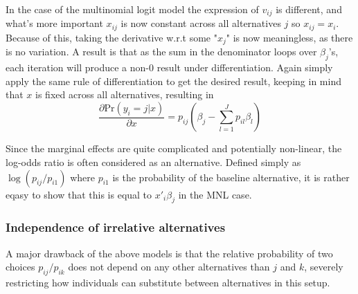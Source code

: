 In the case of the multinomial logit model the expression of $v_{ij}$ is different, and what's more important $x_{ij}$ is now constant across all alternatives $j$ so $x_{ij}=x_i$. Because of this, taking the derivative w.r.t some "$x_j$" is now meaningless, as there is no variation. A result is that as the sum in the denominator loops over $\beta_j$'s, each iteration will produce a non-0 result under differentiation. Again simply apply the same rule of differentiation to get the desired result, keeping in mind that $x$ is fixed across all alternatives, resulting in
\begin{equation}
\frac{\partial \textrm{Pr}(y_i = j|x)}{\partial x} = p_{ij}\left(
\beta_j - \sum_{l=1}^J p_{il}\beta_l
\right)
\end{equation}

Since the marginal effects are quite complicated and potentially non-linear, the log-odds ratio is often considered as an alternative. Defined simply as $\log(p_{ij}/p_{i1})$ where $p_{i1}$ is the probability of the baseline alternative, it is rather eqasy to show that this is equal to $x'_i \beta_j$ in the MNL case.

\subsubsection{Independence of irrelative alternatives}
A major drawback of the above models is that the relative probability of two choices $p_{ij}/p_{ik}$ does not depend on any other alternatives than $j$ and $k$, severely restricting how individuals can substitute between alternatives in this setup. 
